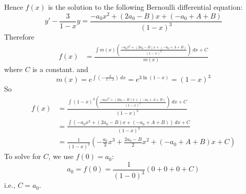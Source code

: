 Hence $f(x)$ is the solution to
the following Bernoulli differential equation:
\[
y' - \frac{3}{1-x} y 
= \frac{-a_0x^2 + (2 a_0 - B) x + (-a_0 + A + B)}{(1-x)^3}
\]
Therefore
\begin{align*}
f(x) &= \frac
       {
         \displaystyle\int m(x)
         \left(
           \frac{-a_0x^2 + (2 a_0 - B) x + (-a_0 + A + B)}{(1-x)^3}
           \right) \ dx
           + C
       }
       {  m(x) }
\end{align*}
where
$C$ is a constant.
and
\[
m(x)
= e^{ \int \left( -\frac{3}{1-x} \right) \ dx}
= e^{ 3 \ln (1 - x) }
= (1 - x)^3
\]
So
\begin{align*}
f(x)
&= \frac
{
  \displaystyle\int (1-x)^3
  \left(
    \frac{-a_0x^2 + (2 a_0 - B) x + (-a_0 + A + B)}{(1-x)^3}
  \right) \ dx + C
}
{ (1-x)^3 } 
\\
&= \frac
{
  \displaystyle\int 
  \left(
    -a_0x^2 + (2 a_0 - B) x + (-a_0 + A + B)
  \right) \ dx + C
}
{ (1-x)^3 }
\\
&=
\frac{1}{(1-x)^3}
\left(
    -\frac{a_0}{3}x^3 + \frac{2 a_0 - B}{2}x^2 + (-a_0 + A + B )x + C
\right)
\end{align*}
To solve for $C$, we use $f(0) = a_0$:
\[
a_0 = f(0) = \frac{1}{(1-0)^3} \left( 0 + 0 + 0 + C \right)
\]
i.e., $C = a_0$.

